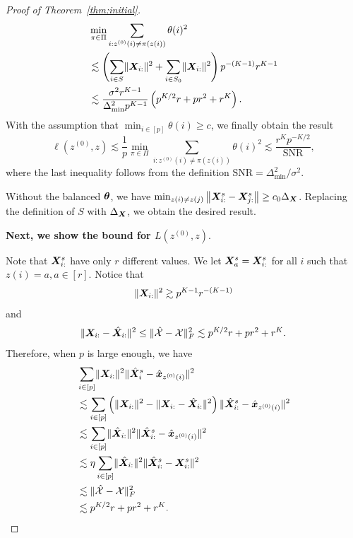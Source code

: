 \documentclass[journal]{IEEEtran}
\theoremstyle{definition}
\theoremstyle{definition}
\newcommand{\of}[1]{\left(#1\right)}
\begin{document}
\begin{proof}[Proof of Theorem~\ref{thm:initial}]
    \begin{align}
        &\min_{\pi \in \Pi} \sum_{i : z^{(0)}(i) \neq \pi(z(i))} \theta(i)^2  \\
        &\lesssim \of{\sum_{i \in S} \onormSize{}{\mX_{i:}}^2 + \sum_{i \in S_0} \onormSize{}{\mX_{i:}}^2  } p^{-(K-1)} r^{K-1} \\
        & \lesssim \frac{\sigma^2 r^{K-1}}{ \Delta_{\min}^2  p^{K-1} } \of{ p^{K/2}r + pr^2 + r^K }.\label{eq:theta_sum}
    \end{align}
    With the assumption that $\min_{i \in [p]} \theta(i) \geq c$, we finally obtain the result
    \begin{equation}
        \ell(z^{(0)}, z) \lesssim \frac{1}{p}\min_{\pi \in \Pi} \sum_{i : z^{(0)}(i) \neq \pi(z(i))} \theta(i)^2 \lesssim \frac{r^K p^{-K/2} }{ \text{SNR} },
    \end{equation}
    where the last inequality follows from the definition $\text{SNR} = \Delta_{\min}^2/\sigma^2$.
    
      {Without the balanced $\boldsymbol{\theta}$, we have $\min_{z(i) \neq z(j)} \left\lVert \bm X^s_{i:} - \bm X^s_{j:} \right\rVert \geq c_0  \Delta_{\bm X}$. Replacing the definition of $S$ with $\Delta_{\bm X}$, we obtain the desired result.}
    
    \textbf{Next, we show the bound for $L(z^{(0)}, z).$}
    
    Note that $\bm X_{i:}^s$ have only $r$ different values. We let $\bm X_a^s = \bm X_{i:}^s$ for all $i$ such that $z(i) = a, a \in [r]$. 
    Notice that 
\begin{equation}
    \lVert\bm X_{i:}\rVert^2 \gtrsim p^{K-1} r^{-(K-1)} 
\end{equation}
and
\begin{equation}
    \lVert\bm X_{i:} - \hat {\bm X}_{i:}\rVert^2 \leq \lVert\hat {\mathcal{X}} - \mathcal{X}\rVert_F^2 \lesssim  p^{K/2}r + pr^2 + r^K .
\end{equation}
Therefore, when $p$ is large enough, we have 
\begin{align}
    &\sum_{i \in [p]} \onormSize{}{\mX_{i:}}^2 \onormSize{}{\hat \mX_i^s - \hat \mx_{z^{(0)}(i)}}^2\\
    &\lesssim \sum_{i \in [p]} \of{\onormSize{}{\mX_{i:}}^2 - \onormSize{}{\mX_{i:} - \hat \mX_{i:}}^2} \onormSize{}{\hat \mX_{i:}^s - \hat \mx_{z^{(0)}(i)}}^2\\
   & \lesssim \sum_{i \in [p]} \onormSize{}{\hat \mX_{i:}}^2 \onormSize{}{\hat \mX_{i:}^s - \hat \mx_{z^{(0)}(i)}}^2 \\
   & \lesssim \eta  \sum_{i \in [p]} \onormSize{}{\hat \mX_{i:}}^2 \onormSize{}{\hat \mX_{i:}^s - \mX_{i:}^s}^2 \\
   & \lesssim \onormSize{}{\hat \tX - \tX}_F^2 \\
   & \lesssim p^{K/2}r + pr^2 + r^K .\label{eq:cor_1}
\end{align}


\end{proof}
\end{document}
